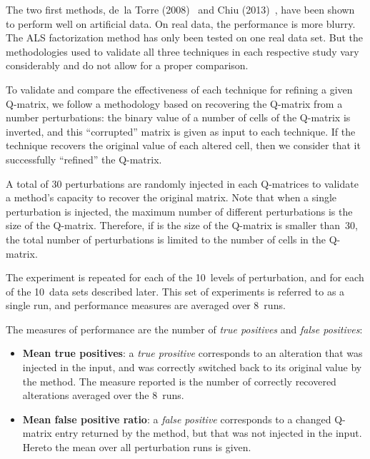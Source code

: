 
The two first methods, de~la Torre (2008)~\citep{delaTorre2008} and Chiu (2013)~\citep{chiu2013statistical}, have been shown to perform well on artificial data.  On real data, the performance is more blurry.  The ALS factorization method \citep{Desmarais2013aied} has only been tested on one real data set.  But the methodologies used to validate all three techniques in each respective study vary considerably and do not allow for a proper comparison.

To validate and compare the effectiveness of each technique for refining a given Q-matrix, we follow a methodology based on recovering the Q-matrix from a number perturbations: the binary value of a number of cells of the Q-matrix is inverted, and this ``corrupted'' matrix is given as input to each technique.  If the technique recovers the original value of each altered cell, then we consider that it successfully ``refined'' the Q-matrix.

A total of 30 perturbations are randomly injected in each Q-matrices to validate a method's capacity to recover the original matrix.  Note that when a single perturbation is injected, the maximum number of different perturbations is the size of the Q-matrix. Therefore, if is the size of the Q-matrix is smaller than~30, the total number of perturbations is limited to the number of cells in the Q-matrix.

The experiment is repeated for each of the 10~levels of perturbation, and for each of the 10~data sets described later.  This set of experiments is referred to as a single run, and performance measures are averaged over 8~runs.

The measures of performance are the number of \textit{true positives} and \textit{false positives}:
\begin{itemize}
\item \textbf{Mean true positives}: a \textit{true prositive} corresponds to an alteration that was injected in the input, and was correctly switched back to its original value by the method. The measure reported is the number of correctly recovered alterations averaged over the 8~runs. 
\item \textbf{Mean false positive ratio}: a \textit{false positive} corresponds to a changed Q-matrix entry returned by the method, but that was not injected in the input.  Hereto the mean over all perturbation runs is given.
\end{itemize}

